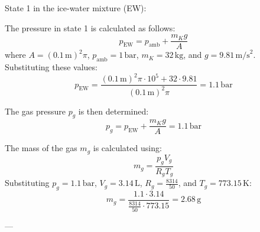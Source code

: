 State 1 in the ice-water mixture (EW):  

The pressure in state 1 is calculated as follows:  
\[
p_{\text{EW}} = p_{\text{amb}} + \frac{m_K g}{A}
\]  
where \( A = (0.1 \, \text{m})^2 \pi \), \( p_{\text{amb}} = 1 \, \text{bar} \), \( m_K = 32 \, \text{kg} \), and \( g = 9.81 \, \text{m/s}^2 \). Substituting these values:  
\[
p_{\text{EW}} = \frac{(0.1 \, \text{m})^2 \pi \cdot 10^5 + 32 \cdot 9.81}{(0.1 \, \text{m})^2 \pi} = 1.1 \, \text{bar}
\]  

The gas pressure \( p_g \) is then determined:  
\[
p_g = p_{\text{EW}} + \frac{m_K g}{A} = 1.1 \, \text{bar}
\]  

The mass of the gas \( m_g \) is calculated using:  
\[
m_g = \frac{p_g V_g}{R_g T_g}
\]  
Substituting \( p_g = 1.1 \, \text{bar} \), \( V_g = 3.14 \, \text{L} \), \( R_g = \frac{8314}{50} \), and \( T_g = 773.15 \, \text{K} \):  
\[
m_g = \frac{1.1 \cdot 3.14}{\frac{8314}{50} \cdot 773.15} = 2.68 \, \text{g}
\]  

---